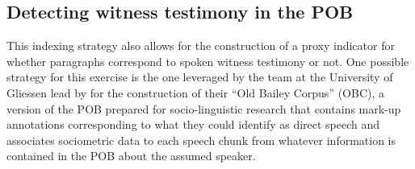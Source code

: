 \subsection{Detecting witness testimony in the POB}

This indexing strategy also allows for the construction of a proxy indicator for whether paragraphs correspond to spoken witness testimony or not.
One possible strategy for this exercise is the one leveraged by the team at the University of Gliessen lead by \citeauthor{huber2007} for the construction of their ``Old Bailey Corpus'' (OBC), a version of the POB prepared for socio-linguistic research that contains mark-up annotations corresponding to what they could identify as direct speech and associates sociometric data to each speech chunk from whatever information is contained in the POB about the assumed speaker.

